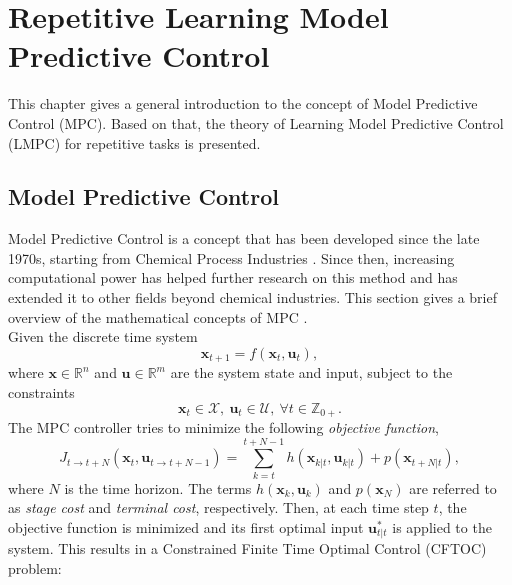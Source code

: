 \chapter{Repetitive Learning Model Predictive Control}
This chapter gives a general introduction to the concept of Model Predictive Control (MPC). Based on that, the theory of Learning Model Predictive Control (LMPC) for repetitive tasks is presented. %

\section{Model Predictive Control}
Model Predictive Control is a concept that has been developed since the late 1970s, starting from Chemical Process Industries \cite{garcia1989model}. Since then, increasing computational power  has helped further research on this method and has extended it to other fields beyond chemical industries.
This section gives a brief overview of the mathematical concepts of MPC \cite{Borrelli2003}.\\
Given the discrete time system
\begin{equation}\label{eq:systemDynamics}
\bm{x}_{t+1}=f(\bm{x}_t,\bm{u}_t),
\end{equation}
where $\bm{x}\in \mathbb{R}^n$ and $\bm{u}\in\mathbb{R}^m$ are the system state and input, subject to the constraints
\begin{equation}
\bm{x}_t\in\mathcal{X},\ \bm{u}_t\in\mathcal{U},\ \forall t\in\mathbb{Z}_{0+}.
\end{equation}
The MPC controller tries to minimize the following \emph{objective function},
\begin{equation}
J_{t\rightarrow t+N}(\bm{x}_t,\bm{u}_{t\rightarrow t+N-1})=\sum_{k=t}^{t+N-1}h(\bm{x}_{k|t},\bm{u}_{k|t}) + p(\bm{x}_{t+N|t}),
\end{equation}
where $N$ is the time horizon. The terms $h(\bm{x}_k,\bm{u}_k)$ and $p(\bm{x}_N)$ are referred to as \emph{stage cost} and \emph{terminal cost}, respectively. 
Then, at each time step $t$, the objective function is minimized and its first optimal input $\bm{u}_{t|t}^*$ is applied to the system. This results in a Constrained Finite Time Optimal Control (CFTOC) problem:
